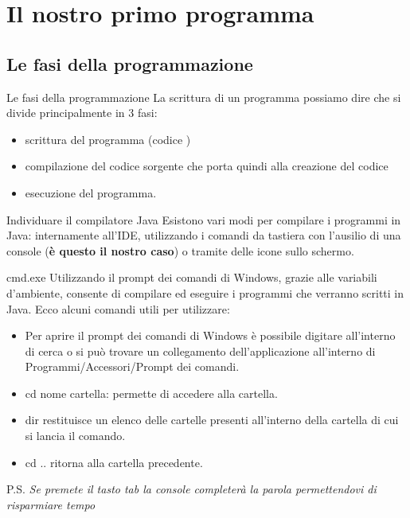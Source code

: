 \section{Il nostro primo programma}
\subsection{Le fasi della programmazione}
\begin{frame}{}
\begin{block}{Le fasi della programmazione}
La scrittura di un programma possiamo dire che si divide principalmente in 3 fasi:
\begin{itemize}
\item scrittura del programma (codice )
\item compilazione del codice sorgente che porta quindi alla creazione del codice 
\item esecuzione del programma.
\end{itemize}
\end{block}
\begin{block}{Individuare il compilatore Java}
Esistono vari modi per compilare i programmi in Java: internamente all'IDE, utilizzando i comandi da tastiera con l'ausilio di una console (\textbf{è questo il nostro caso}) o tramite delle icone sullo schermo.
\end{block}
\end{frame}
\begin{frame}
\begin{block}{cmd.exe}
Utilizzando il prompt dei comandi di Windows, grazie alle variabili d'ambiente, consente di compilare ed eseguire i programmi 
che verranno scritti in Java. Ecco alcuni comandi utili per utilizzare:
\begin{itemize}
\item Per aprire il prompt dei comandi di Windows è possibile digitare all'interno di cerca  o si può trovare 
un collegamento dell'applicazione all'interno di Programmi/Accessori/Prompt dei comandi.
\item \alert{cd} nome cartella: permette di accedere alla cartella.
\item \alert{dir} restituisce un elenco delle cartelle presenti all'interno della cartella di cui si lancia il comando.
\item \alert{cd ..} ritorna alla cartella precedente.
\end{itemize}
\end{block}
\pause
P.S. \textit{Se premete il tasto tab la console completerà la parola permettendovi di risparmiare tempo}
\end{frame}

